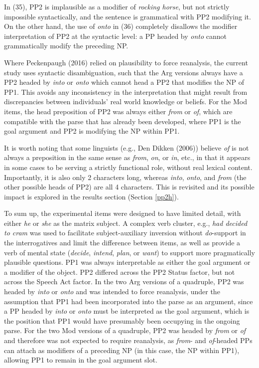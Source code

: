\documentclass[11pt,oneside]{book}
\begin{document}
In (35), PP2 is implausible as a modifier of \emph{rocking horse}, but not strictly impossible syntactically, and the sentence is grammatical with PP2 modifying it. On the other hand, the use of \emph{onto} in (36) completely disallows the modifier interpretation of PP2 at the syntactic level: a PP headed by \emph{onto} cannot grammatically modify the preceding NP.

Where Peckenpaugh (2016) relied on plausibility to force reanalysis, the current study uses syntactic disambiguation, such that the Arg versions always have a PP2 headed by \emph{into} or \emph{onto} which cannot head a PP2 that modifies the NP of PP1. This avoids any inconsistency in the interpretation that might result from discrepancies between individuals' real world knowledge or beliefs. For the Mod items, the head preposition of PP2 was always either \emph{from} or \emph{of}, which are compatible with the parse that has already been developed, where PP1 is the goal argument and PP2 is modifying the NP within PP1.

It is worth noting that some linguists (e.g., Den Dikken (2006)) believe \emph{of} is not always a preposition in the same sense as \emph{from}, \emph{on}, or \emph{in}, etc., in that it appears in some cases to be serving a strictly functional role, without real lexical content. Importantly, it is also only 2 characters long, whereas \emph{into}, \emph{onto}, and \emph{from} (the other possible heads of PP2) are all 4 characters. This is revisited and its possible impact is explored in the results section (Section \ref{pp2h}).

To sum up, the experimental items were designed to have limited detail, with either \emph{he} or \emph{she} as the matrix subject. A complex verb cluster, e.g., \emph{had decided to cram} was used to facilitate subject-auxiliary inversion without \emph{do}-support in the interrogatives and limit the difference between items, as well as provide a verb of mental state (\emph{decide}, \emph{intend}, \emph{plan}, or \emph{want}) to support more pragmatically plausible questions. PP1 was always interpretable as either the goal argument or a modifier of the object. PP2 differed across the PP2 Status factor, but not across the Speech Act factor. In the two Arg versions of a quadruple, PP2 was headed by \emph{into} or \emph{onto} and was intended to force reanalysis, under the assumption that PP1 had been incorporated into the parse as an argument, since a PP headed by \emph{into} or \emph{onto} must be interpreted as the goal argument, which is the position that PP1 would have presumably been occupying in the ongoing parse. For the two Mod versions of a quadruple, PP2 was headed by \emph{from} or \emph{of} and therefore was not expected to require reanalysis, as \emph{from}- and \emph{of}-headed PPs can attach as modifiers of a preceding NP (in this case, the NP within PP1), allowing PP1 to remain in the goal argument slot.
\end{document}
